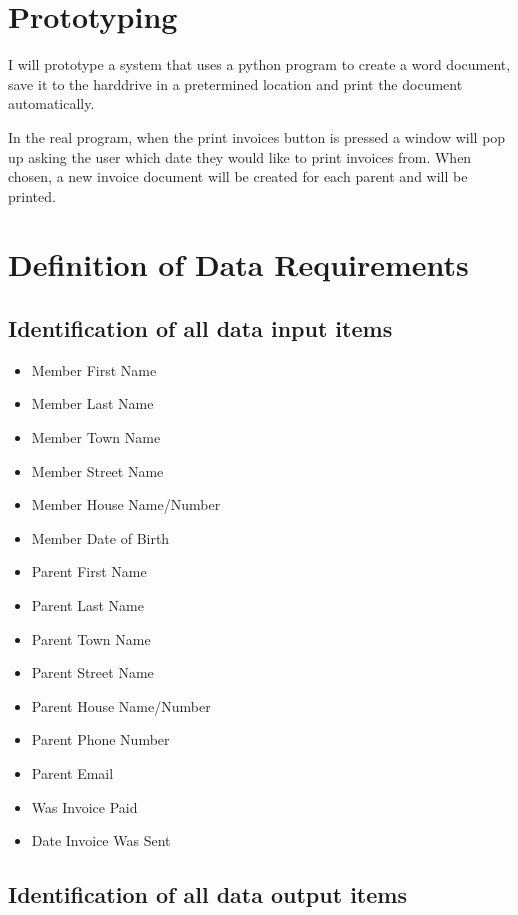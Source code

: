 \section{Prototyping}
I will prototype a system that uses a python program to create a word document, save it to the harddrive in a pretermined location and print the document automatically.

In the real program, when the print invoices button is pressed a window will pop up asking the user which date they would like to print invoices from. When chosen, a new invoice document will be created for each parent and will be printed.

\section{Definition of Data Requirements}

\subsection{Identification of all data input items}

\begin{itemize}
	\item Member First Name
	\item Member Last Name
	\item Member Town Name
	\item Member Street Name
	\item Member House Name/Number
	\item Member Date of Birth
	\item Parent First Name
	\item Parent Last Name
	\item Parent Town Name
	\item Parent Street Name
	\item Parent House Name/Number
	\item Parent Phone Number
	\item Parent Email
	\item Was Invoice Paid
	\item Date Invoice Was Sent
\end{itemize}

\subsection{Identification of all data output items}

